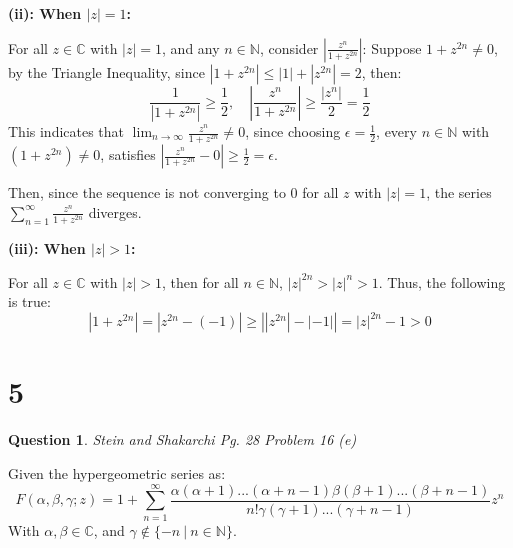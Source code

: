 \documentclass{article}
\newtheorem{question}{Question}
\begin{document}
\hfill

\hfill

\textbf{(ii): When $|z|=1$:}

For all $z\in\mathbb{C}$ with $|z|=1$, and any $n\in\mathbb{N}$, consider $\left|\frac{z^n}{1+z^{2n}}\right|$:
Suppose $1+z^{2n}\neq 0$, by the Triangle Inequality, since $|1+z^{2n}| \leq |1|+|z^{2n}|=2$, then:
$$\frac{1}{|1+z^{2n}|} \geq \frac{1}{2},\quad \left|\frac{z^n}{1+z^{2n}}\right|\geq\frac{|z^n|}{2}=\frac{1}{2}$$
This indicates that $\lim_{n\rightarrow\infty}\frac{z^n}{1+z^{2n}}\neq 0$, since choosing $\epsilon=\frac{1}{2}$, every $n\in\mathbb{N}$ with $(1+z^{2n})\neq 0$,
satisfies $\left|\frac{z^n}{1+z^{2n}}-0\right|\geq \frac{1}{2}=\epsilon$. 

Then, since the sequence is not converging to $0$ for all $z$ with $|z|=1$, the series $\sum_{n=1}^{\infty}\frac{z^n}{1+z^{2n}}$ diverges.

\hfill

\hfill

\textbf{(iii): When $|z|>1$:}

For all $z\in\mathbb{C}$ with $|z|>1$, then for all $n\in\mathbb{N}$, $|z|^{2n}>|z|^n>1$. Thus, the following is true:
$$|1+z^{2n}|=|z^{2n}-(-1)|\geq \left||z^{2n}|-|-1|\right| = |z|^{2n}-1 >0$$

\break

\section*{5}
\begin{question}
    Stein and Shakarchi Pg. 28 Problem 16 (e)
\end{question}

Given the hypergeometric series as:
$$F(\alpha,\beta,\gamma; z)=1+\sum_{n=1}^{\infty}\frac{\alpha(\alpha+1)...(\alpha+n-1)\beta(\beta+1)...(\beta+n-1)}{n!\gamma(\gamma+1)...(\gamma+n-1)}z^n$$
With $\alpha,\beta\in\mathbb{C}$, and $\gamma\notin \{-n\ |\ n\in\mathbb{N}\}$.

\hfill

\hfill

\hfill
\end{document}
